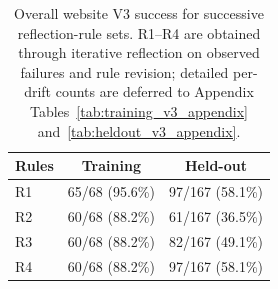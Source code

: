 \begin{table}[t]
\centering
\small
\begin{tabular}{lcc}
\toprule
Rules & Training & Held-out \\
\midrule
R1 & 65/68 (95.6\%) & 97/167 (58.1\%) \\
R2 & 60/68 (88.2\%) & 61/167 (36.5\%) \\
R3 & 60/68 (88.2\%) & 82/167 (49.1\%) \\
R4 & 60/68 (88.2\%) & 97/167 (58.1\%) \\
\bottomrule
\end{tabular}
\caption{Overall website V3 success for successive reflection-rule sets. R1--R4 are obtained through iterative reflection on observed failures and rule revision; detailed per-drift counts are deferred to Appendix Tables~\ref{tab:training_v3_appendix} and~\ref{tab:heldout_v3_appendix}.}
\label{tab:v3_reflection_overall}
\end{table}

